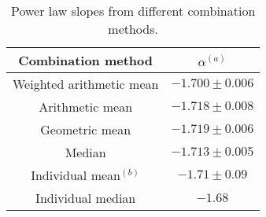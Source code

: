 \begin{table}
\centering
\begin{center}
\caption{Power law slopes from different combination methods.}
\begin{tabular}{cc}
\hline
\noalign{\smallskip}
Combination method &  $\alpha$$^{(a)}$ \\  
\hline


Weighted arithmetic mean  & $-1.700\pm 0.006$   \\
Arithmetic mean  & $-1.718\pm 0.008$   \\
Geometric mean  & $-1.719\pm 0.006$   \\
Median  & $-1.713\pm 0.005$   \\







Individual mean$^{(b)}$  & $-1.71\pm 0.09$   \\
Individual median & $-1.68$   \\


\hline
\hline
\end{tabular}
\end{center}


\end{table}



